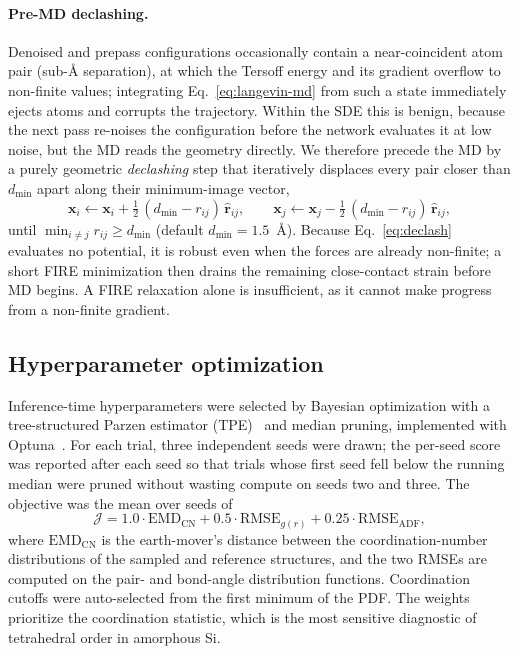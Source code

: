 \paragraph{Pre-MD declashing.}
Denoised and prepass configurations occasionally contain a near-coincident
atom pair (sub-\AA{} separation), at which the Tersoff energy and its gradient
overflow to non-finite values; integrating Eq.~\eqref{eq:langevin-md} from such
a state immediately ejects atoms and corrupts the trajectory. Within the SDE
this is benign, because the next pass re-noises the configuration before the
network evaluates it at low noise, but the MD reads the geometry directly. We
therefore precede the MD by a purely geometric \emph{declashing} step that
iteratively displaces every pair closer than $d_{\min}$ apart along their
minimum-image vector,
\begin{equation}
    \mathbf{x}_i \leftarrow \mathbf{x}_i
      + \tfrac{1}{2}\,(d_{\min}-r_{ij})\,\hat{\mathbf{r}}_{ij},
    \qquad
    \mathbf{x}_j \leftarrow \mathbf{x}_j
      - \tfrac{1}{2}\,(d_{\min}-r_{ij})\,\hat{\mathbf{r}}_{ij},
    \label{eq:declash}
\end{equation}
until $\min_{i\neq j} r_{ij}\ge d_{\min}$ (default $d_{\min}=1.5$~\AA). Because
Eq.~\eqref{eq:declash} evaluates no potential, it is robust even when the
forces are already non-finite; a short FIRE minimization then drains the
remaining close-contact strain before MD begins. A FIRE relaxation alone is
insufficient, as it cannot make progress from a non-finite gradient.

\subsection{Hyperparameter optimization}
\label{sec:hpo}

Inference-time hyperparameters were selected by Bayesian optimization with a
tree-structured Parzen estimator (TPE)~\cite{bergstra2011algorithms} and
median pruning, implemented with Optuna~\cite{akiba2019optuna}. For each
trial, three independent seeds were drawn; the per-seed score was reported
after each seed so that trials whose first seed fell below the running
median were pruned without wasting compute on seeds two and three. The
objective was the mean over seeds of
\begin{equation}
    \mathcal{J}
    = 1.0\cdot\mathrm{EMD}_{\mathrm{CN}}
    + 0.5\cdot\mathrm{RMSE}_{g(r)}
    + 0.25\cdot\mathrm{RMSE}_{\mathrm{ADF}},
    \label{eq:hpo-objective}
\end{equation}
where $\mathrm{EMD}_{\mathrm{CN}}$ is the earth-mover's distance between the
coordination-number distributions of the sampled and reference structures,
and the two RMSEs are computed on the pair- and bond-angle distribution
functions. Coordination cutoffs were auto-selected from the first minimum of
the PDF. The weights prioritize the coordination statistic, which is the
most sensitive diagnostic of tetrahedral order in amorphous Si.

